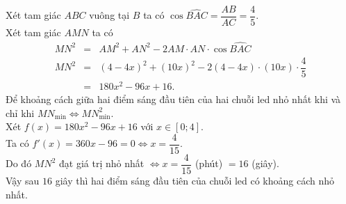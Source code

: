\begin{bt}
{		Xét tam giác $ABC$ vuông tại $B$ ta có $\cos\widehat{BAC} = \dfrac{AB}{AC} =  \dfrac{4}{5}$.\\
		Xét tam  giác $AMN$ ta có
		\begin{eqnarray*}
			MN^2& = &AM^2+AN^2-2AM \cdot AN  \cdot \cos\widehat{BAC}\\
			MN^2&=&(4-4x)^2 + (10x)^2 - 2(4-4x)  \cdot (10x) \cdot \dfrac{4}{5}\\
			& = & 180x^2 - 96x +  16.
		\end{eqnarray*}
		Để khoảng cách giữa hai điểm sáng đầu  tiên của hai chuỗi led nhỏ nhất khi và chỉ khi $MN_{\min} \Leftrightarrow MN_{\min}^2$.\\
		Xét  $f(x) = 180x^2 - 96x + 16$ với $x \in [0;4]$.\\
		Ta có $f'(x) = 360x - 96 = 0 \Leftrightarrow x  = \dfrac{4}{15}$.\\
		Do đó $MN^2$ đạt giá trị nhỏ nhất  $\Leftrightarrow x = \dfrac{4}{15}$ (phút) $= 16$ (giây).\\
		Vậy sau $16$ giây thì hai điểm sáng đầu tiên của chuỗi led có khoảng  cách nhỏ nhất.
	 }
\end{bt}

